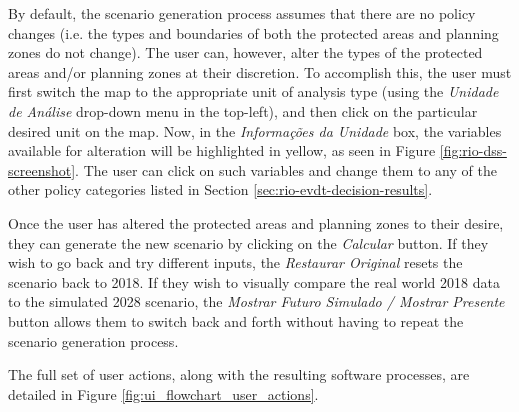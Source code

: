 By default, the scenario generation process assumes that there are no policy changes (i.e. the types and boundaries of both the protected areas and planning zones do not change). The user can, however, alter the types of the protected areas and/or planning zones at their discretion. To accomplish this, the user must first switch the map to the appropriate unit of analysis type (using the \textit{Unidade de Análise} drop-down menu in the top-left), and then click on the particular desired unit on the map. Now, in the \textit{Informações da Unidade} box, the variables available for alteration will be highlighted in yellow, as seen in Figure \ref{fig:rio-dss-screenshot}. The user can click on such variables and change them to any of the other policy categories listed in Section \ref{sec:rio-evdt-decision-results}.

Once the user has altered the protected areas and planning zones to their desire, they can generate the new scenario by clicking on the \textit{Calcular} button. If they wish to go back and try different inputs, the \textit{Restaurar Original} resets the scenario back to 2018. If they wish to visually compare the real world 2018 data to the simulated 2028 scenario, the \textit{Mostrar Futuro Simulado / Mostrar Presente} button allows them to switch back and forth without having to repeat the scenario generation process.

The full set of user actions, along with the resulting software processes, are detailed in Figure \ref{fig:ui_flowchart_user_actions}.

